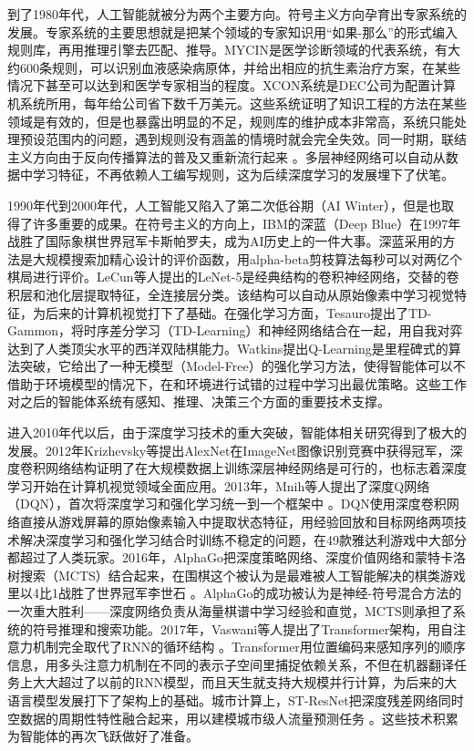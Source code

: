 到了1980年代，人工智能就被分为两个主要方向。符号主义方向孕育出专家系统的发展。专家系统的主要思想就是把某个领域的专家知识用“如果-那么”的形式编入规则库，再用推理引擎去匹配、推导。MYCIN是医学诊断领域的代表系统，有大约600条规则，可以识别血液感染病原体，并给出相应的抗生素治疗方案，在某些情况下甚至可以达到和医学专家相当的程度。XCON系统是DEC公司为配置计算机系统所用，每年给公司省下数千万美元。这些系统证明了知识工程的方法在某些领域是有效的，但是也暴露出明显的不足，规则库的维护成本非常高，系统只能处理预设范围内的问题，遇到规则没有涵盖的情境时就会完全失效。同一时期，联结主义方向由于反向传播算法的普及又重新流行起来 。多层神经网络可以自动从数据中学习特征，不再依赖人工编写规则，这为后续深度学习的发展埋下了伏笔。

1990年代到2000年代，人工智能又陷入了第二次低谷期（AI Winter），但是也取得了许多重要的成果。在符号主义的方向上，IBM的深蓝（Deep Blue）在1997年战胜了国际象棋世界冠军卡斯帕罗夫，成为AI历史上的一件大事。深蓝采用的方法是大规模搜索加精心设计的评价函数，用alpha-beta剪枝算法每秒可以对两亿个棋局进行评价。LeCun等人提出的LeNet-5是经典结构的卷积神经网络，交替的卷积层和池化层提取特征，全连接层分类。该结构可以自动从原始像素中学习视觉特征，为后来的计算机视觉打下了基础。在强化学习方面，Tesauro提出了TD-Gammon，将时序差分学习（TD-Learning）和神经网络结合在一起，用自我对弈达到了人类顶尖水平的西洋双陆棋能力。Watkins提出Q-Learning是里程碑式的算法突破，它给出了一种无模型（Model-Free）的强化学习方法，使得智能体可以不借助于环境模型的情况下，在和环境进行试错的过程中学习出最优策略。这些工作对之后的智能体系统有感知、推理、决策三个方面的重要技术支撑。

进入2010年代以后，由于深度学习技术的重大突破，智能体相关研究得到了极大的发展。2012年Krizhevsky等提出AlexNet在ImageNet图像识别竞赛中获得冠军，深度卷积网络结构证明了在大规模数据上训练深层神经网络是可行的，也标志着深度学习开始在计算机视觉领域全面应用。2013年，Mnih等人提出了深度Q网络（DQN），首次将深度学习和强化学习统一到一个框架中 。DQN使用深度卷积网络直接从游戏屏幕的原始像素输入中提取状态特征，用经验回放和目标网络两项技术解决深度学习和强化学习结合时训练不稳定的问题，在49款雅达利游戏中大部分都超过了人类玩家。2016年，AlphaGo把深度策略网络、深度价值网络和蒙特卡洛树搜索（MCTS）结合起来，在围棋这个被认为是最难被人工智能解决的棋类游戏里以4比1战胜了世界冠军李世石 。AlphaGo的成功被认为是神经-符号混合方法的一次重大胜利——深度网络负责从海量棋谱中学习经验和直觉，MCTS则承担了系统的符号推理和搜索功能。2017年，Vaswani等人提出了Transformer架构，用自注意力机制完全取代了RNN的循环结构 。Transformer用位置编码来感知序列的顺序信息，用多头注意力机制在不同的表示子空间里捕捉依赖关系，不但在机器翻译任务上大大超过了以前的RNN模型，而且天生就支持大规模并行计算，为后来的大语言模型发展打下了架构上的基础。城市计算上，ST-ResNet把深度残差网络同时空数据的周期性特性融合起来，用以建模城市级人流量预测任务 。这些技术积累为智能体的再次飞跃做好了准备。

